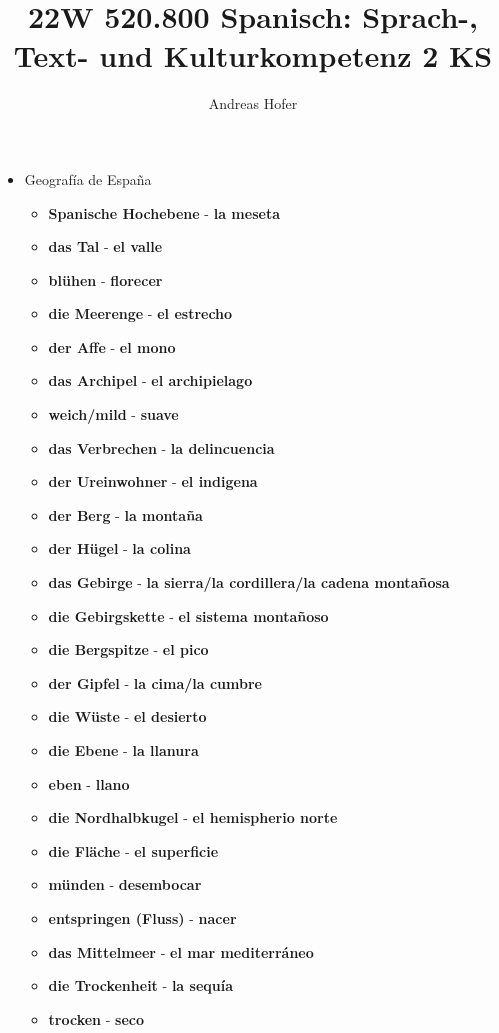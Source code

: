 \documentclass{article}
\title{\vspace{-3cm}22W 520.800 Spanisch: Sprach-, Text- und Kulturkompetenz 2 KS}
\author{Andreas Hofer}
\begin{document}
	\begin{multicols}{2}
	\begin{itemize}
		\item{Geografía de España}
		\begin{itemize}
			\item{\textbf{Spanische Hochebene} - \textbf{la meseta}}
			\item{\textbf{das Tal} - \textbf{el valle}}
			\item{\textbf{blühen} - \textbf{florecer}}
			\item{\textbf{die Meerenge} - \textbf{el estrecho}}
			\item{\textbf{der Affe} - \textbf{el mono}}
			\item{\textbf{das Archipel} - \textbf{el archipielago}}
			\item{\textbf{weich/mild} - \textbf{suave}}
			\item{\textbf{das Verbrechen} - \textbf{la delincuencia}}
			\item{\textbf{der Ureinwohner} - \textbf{el indigena}}
			\item{\textbf{der Berg} - \textbf{la montaña}}
			\item{\textbf{der Hügel} - \textbf{la colina}}
			\item{\textbf{das Gebirge} - \textbf{la sierra/la cordillera/la cadena montañosa}}
			\item{\textbf{die Gebirgskette} - \textbf{el sistema montañoso}}
			\item{\textbf{die Bergspitze} - \textbf{el pico}}
			\item{\textbf{der Gipfel} - \textbf{la cima/la cumbre}}
			\item{\textbf{die Wüste} - \textbf{el desierto}}
			\item{\textbf{die Ebene} - \textbf{la llanura}}
			\item{\textbf{eben} - \textbf{llano}}
			\item{\textbf{die Nordhalbkugel} - \textbf{el hemispherio norte}}
			\item{\textbf{die Fläche} - \textbf{el superficie}}
			\item{\textbf{münden} - \textbf{desembocar}}
			\item{\textbf{entspringen (Fluss)} - \textbf{nacer}}
			\item{\textbf{das Mittelmeer} - \textbf{el mar mediterráneo}}
			\item{\textbf{die Trockenheit} - \textbf{la sequía}}
			\item{\textbf{trocken} - \textbf{seco}}

\end{itemize}
\end{itemize}
\end{multicols}
\end{document}
